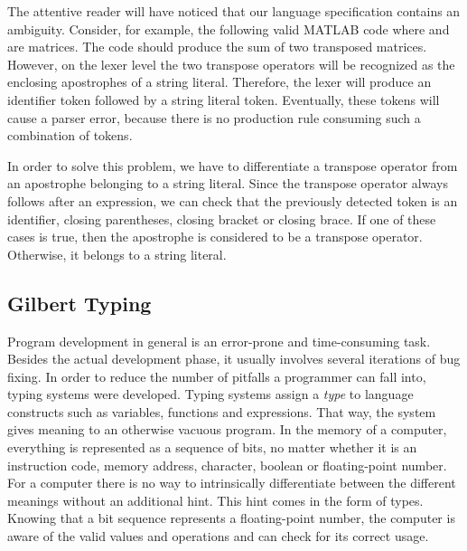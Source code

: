 The attentive reader will have noticed that our language specification contains an ambiguity.
Consider, for example, the following valid MATLAB code  where  and  are matrices.
The code should produce the sum of two transposed matrices.
However, on the lexer level the two transpose operators will be recognized as the enclosing apostrophes of a string literal.
Therefore, the lexer will produce an identifier token followed by a string literal token.
Eventually, these tokens will cause a parser error, because there is no production rule consuming such a combination of tokens.

In order to solve this problem, we have to differentiate a transpose operator from an apostrophe belonging to a string literal.
Since the transpose operator always follows after an expression, we can check that the previously detected token is an identifier, closing parentheses, closing bracket or closing brace.
If one of these cases is true, then the apostrophe is considered to be a transpose operator.
Otherwise, it belongs to a string literal.

\subsection{Gilbert Typing}
\label{cha:gilberttyping}

Program development in general is an error-prone and time-consuming task.
Besides the actual development phase, it usually involves several iterations of bug fixing.
In order to reduce the number of pitfalls a programmer can fall into, typing systems were developed.
Typing systems assign a \emph{type} to language constructs such as variables, functions and expressions.
That way, the system gives meaning to an otherwise vacuous program.
In the memory of a computer, everything is represented as a sequence of bits, no matter whether it is an instruction code, memory address, character, boolean or floating-point number.
For a computer there is no way to intrinsically differentiate between the different meanings without an additional hint.
This hint comes in the form of types.
Knowing that a bit sequence represents a floating-point number, the computer is aware of the valid values and operations and can check for its correct usage.

